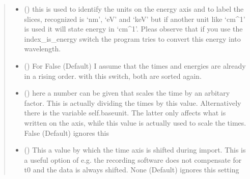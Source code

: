 \documentclass[letterpaper,10pt,english]{sphinxmanual}
\begin{document}
\begin{fulllineitems}
\begin{quote}
\begin{description}
\begin{itemize}
\item {} 
 (\sphinxstyleliteralemphasis{\sphinxupquote{ (}}\sphinxstyleliteralemphasis{\sphinxupquote{)}}) \textendash{} this is used to identify the units on the energy axis and to label the slices, recognized is ‘nm’, ‘eV’ and ‘keV’
but if another unit like ‘cm\textasciicircum{}\sphinxhyphen{}1’ is used it will state energy in ‘cm\textasciicircum{}\sphinxhyphen{}1’. Pleas observe that if you use the index\_is\_energy
switch the program tries to convert this energy into wavelength.

\item {} 
 (\sphinxstyleliteralemphasis{\sphinxupquote{ (}}\sphinxstyleliteralemphasis{\sphinxupquote{)}}) \textendash{} For False (Default) I assume that the times and energies are already in a rising order.
with this switch, both are sorted again.

\item {} 
 (\sphinxstyleliteralemphasis{\sphinxupquote{ (}}\sphinxstyleliteralemphasis{\sphinxupquote{)}}) \textendash{} here a number can be given that scales the time by an arbitary factor. This is actually dividing
the times by this value. Alternatively there is the variable self.baseunit. The latter only affects
what is written on the axis, while this value is actually used to scale the times. False (Default)
ignores this

\item {} 
 (\sphinxstyleliteralemphasis{\sphinxupquote{, }}\sphinxstyleliteralemphasis{\sphinxupquote{ (}}\sphinxstyleliteralemphasis{\sphinxupquote{)}}) \textendash{} This a value by which the time axis is shifted during import. This is a useful option of e.g.
the recording software does not compensate for t0 and the data is always shifted.
None (Default) ignores this setting


\end{itemize}
\end{description}
\end{quote}
\end{fulllineitems}
\end{document}

